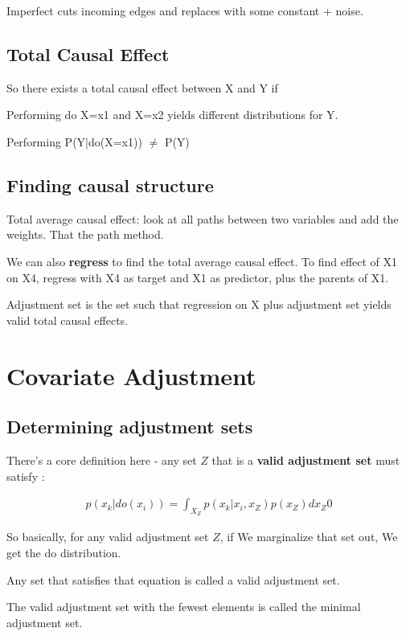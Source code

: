 \documentclass{article}
\begin{document}
	Imperfect cuts incoming edges and replaces with some constant + noise.
	
	\subsection{Total Causal Effect}
	
		So there exists a total causal effect between X and Y if
		
		Performing do X=x1 and X=x2 yields different distributions for Y.
		
		Performing P(Y|do(X=x1)) $\neq$ P(Y)
		
	\subsection{Finding causal structure}
	
		Total average causal effect: look at all paths between two variables and add the weights. That the path method.
		
		We can also \textbf{regress} to find the total average causal effect. To find effect of X1 on X4, regress with X4 as target and X1 as predictor, plus the parents of X1.
		
		Adjustment set is the set such that regression on X plus adjustment set yields valid total causal effects.
		

\section{Covariate Adjustment}

	\subsection{Determining adjustment sets}
	
		There's a core definition here - any set $Z$ that is a \textbf{valid adjustment set} must satisfy :
		
		\begin{align}
			p(x_k|do(x_i)) = \int_{X_Z} p(x_k|x_i, x_Z)p(x_Z) dx_Z0
		\end{align}
		 
		 So basically, for any valid adjustment set $Z$, if We marginalize that set out, We get the do distribution. 
		 
		 Any set that satisfies that equation is called a valid adjustment set.
		 
		 The valid adjustment set with the fewest elements is called the minimal adjustment set.
		
\end{document}
